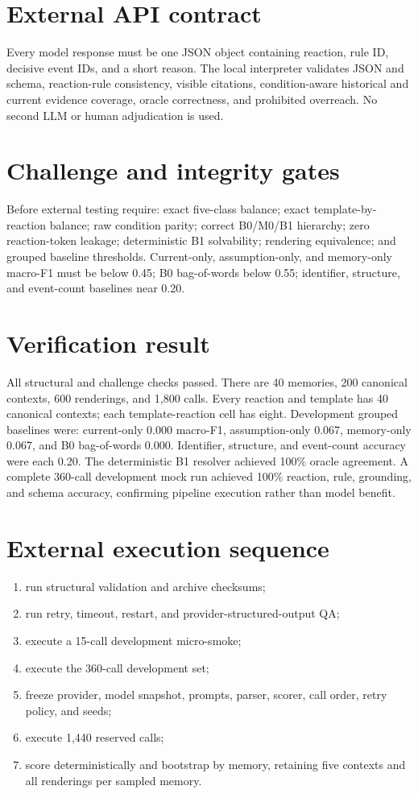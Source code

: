 \documentclass[10.5pt]{article}\usepackage[margin=.82in]{geometry}\usepackage[T1]{fontenc}\usepackage{lmodern,microtype,booktabs,longtable,amsmath,xcolor,hyperref,fancyhdr}
\begin{document}
\section{External API contract}Every model response must be one JSON object containing reaction, rule ID, decisive event IDs, and a short reason. The local interpreter validates JSON and schema, reaction-rule consistency, visible citations, condition-aware historical and current evidence coverage, oracle correctness, and prohibited overreach. No second LLM or human adjudication is used.
\section{Challenge and integrity gates}Before external testing require: exact five-class balance; exact template-by-reaction balance; raw condition parity; correct B0/M0/B1 hierarchy; zero reaction-token leakage; deterministic B1 solvability; rendering equivalence; and grouped baseline thresholds. Current-only, assumption-only, and memory-only macro-F1 must be below 0.45; B0 bag-of-words below 0.55; identifier, structure, and event-count baselines near 0.20.
\section{Verification result}All structural and challenge checks passed. There are 40 memories, 200 canonical contexts, 600 renderings, and 1,800 calls. Every reaction and template has 40 canonical contexts; each template-reaction cell has eight. Development grouped baselines were: current-only 0.000 macro-F1, assumption-only 0.067, memory-only 0.067, and B0 bag-of-words 0.000. Identifier, structure, and event-count accuracy were each 0.20. The deterministic B1 resolver achieved 100\% oracle agreement. A complete 360-call development mock run achieved 100\% reaction, rule, grounding, and schema accuracy, confirming pipeline execution rather than model benefit.
\section{External execution sequence}\begin{enumerate}\item run structural validation and archive checksums;\item run retry, timeout, restart, and provider-structured-output QA;\item execute a 15-call development micro-smoke;\item execute the 360-call development set;\item freeze provider, model snapshot, prompts, parser, scorer, call order, retry policy, and seeds;\item execute 1,440 reserved calls;\item score deterministically and bootstrap by memory, retaining five contexts and all renderings per sampled memory.\end{enumerate}
\end{document}
